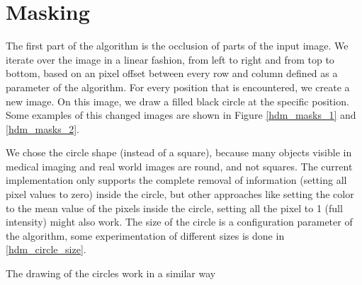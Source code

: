 \section{Masking}

The first part of the algorithm is the occlusion of parts of the input image.
We iterate over the image in a linear fashion, from left to right and from top to bottom, based on an pixel offset between every row and column defined as a parameter of the algorithm.
For every position that is encountered, we create a new image. On this image, we draw a filled black circle at the specific position.
Some examples of this changed images are shown in Figure \ref{hdm_masks_1} and \ref{hdm_masks_2}.

We chose the circle shape (instead of a square), because many objects visible in medical imaging and real world images are round, and not squares.
The current implementation only supports the complete removal of information (setting all pixel values to zero) inside the circle, but other approaches like
setting the color to the mean value of the pixels inside the circle, setting all the pixel to 1 (full intensity) might also work.
The size of the circle is a configuration parameter of the algorithm, some experimentation of different sizes is done in \autoref{hdm_circle_size}.

The drawing of the circles work in a similar way

